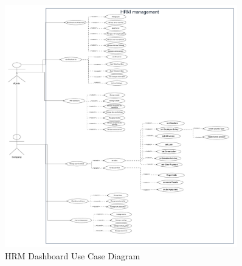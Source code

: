 \begin{figure}[H]
    \centering
    \includegraphics[width=0.9\textwidth]{chapters/chapter 3/figures/diagramGeneralUseCase (1) (1).drawio (1).pdf}
    \caption{HRM Dashboard Use Case Diagram}
    \label{fig:hrm_use_case}
\end{figure}

